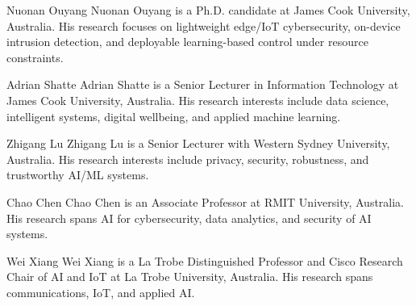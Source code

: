 \documentclass[journal]{IEEEtran}
\begin{document}
\balance



\begin{IEEEbiographynophoto}{Nuonan Ouyang}
Nuonan Ouyang is a Ph.D. candidate at James Cook University, Australia. His research focuses on lightweight edge/IoT cybersecurity, on-device intrusion detection, and deployable learning-based control under resource constraints.
\end{IEEEbiographynophoto}
\begin{IEEEbiographynophoto}{Adrian Shatte}
Adrian Shatte is a Senior Lecturer in Information Technology at James Cook University, Australia. His research interests include data science, intelligent systems, digital wellbeing, and applied machine learning.
\end{IEEEbiographynophoto}
\begin{IEEEbiographynophoto}{Zhigang Lu}
Zhigang Lu is a Senior Lecturer with Western Sydney University, Australia. His research interests include privacy, security, robustness, and trustworthy AI/ML systems.
\end{IEEEbiographynophoto}
\begin{IEEEbiographynophoto}{Chao Chen}
Chao Chen is an Associate Professor at RMIT University, Australia. His research spans AI for cybersecurity, data analytics, and security of AI systems.
\end{IEEEbiographynophoto}
\begin{IEEEbiographynophoto}{Wei Xiang}
Wei Xiang is a La Trobe Distinguished Professor and Cisco Research Chair of AI and IoT at La Trobe University, Australia. His research spans communications, IoT, and applied AI.
\end{IEEEbiographynophoto}
\end{document}
